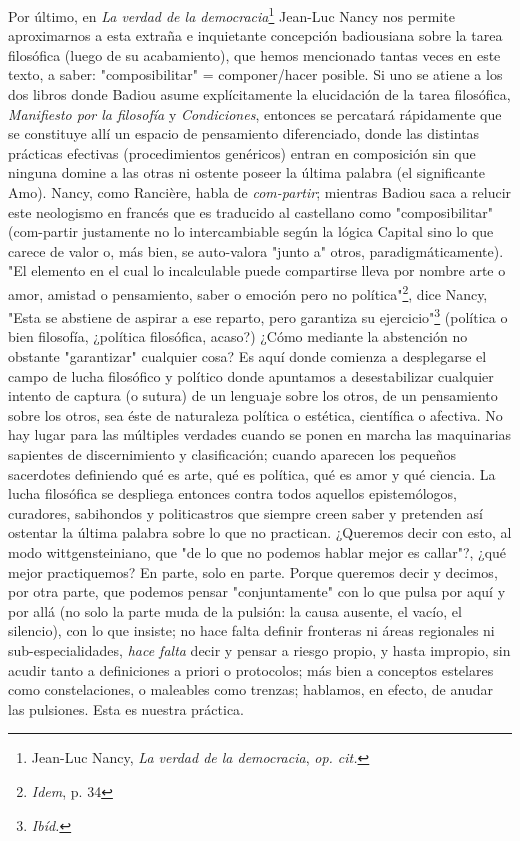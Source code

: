 \documentclass{book}
\begin{document}
Por último, en \emph{La verdad de la democracia}\footnote{Jean-Luc
  Nancy, \emph{La verdad de la democracia}, \emph{op. cit.}} Jean-Luc
Nancy nos permite aproximarnos a esta extraña e inquietante concepción
badiousiana sobre la tarea filosófica (luego de su acabamiento), que
hemos mencionado tantas veces en este texto, a saber: "composibilitar" =
componer/hacer posible. Si uno se atiene a los dos libros donde Badiou
asume explícitamente la elucidación de la tarea filosófica,
\emph{Manifiesto por la filosofía} y \emph{Condiciones}, entonces se
percatará rápidamente que se constituye allí un espacio de pensamiento
diferenciado, donde las distintas prácticas efectivas (procedimientos
genéricos) entran en composición sin que ninguna domine a las otras ni
ostente poseer la última palabra (el significante Amo). Nancy, como
Rancière, habla de \emph{com-partir}; mientras Badiou saca a relucir
este neologismo en francés que es traducido al castellano como
"composibilitar" (com-partir justamente no lo intercambiable según la
lógica Capital sino lo que carece de valor o, más bien, se auto-valora
"junto a" otros, paradigmáticamente). "El elemento en el cual lo
incalculable puede compartirse lleva por nombre arte o amor, amistad o
pensamiento, saber o emoción pero no política"\footnote{\emph{Idem}, p.
  34}, dice Nancy, "Esta se abstiene de aspirar a ese reparto, pero
garantiza su ejercicio"\footnote{\emph{Ibíd.}} (política o bien
filosofía, ¿política filosófica, acaso?) ¿Cómo mediante la abstención no
obstante "garantizar" cualquier cosa? Es aquí donde comienza a
desplegarse el campo de lucha filosófico y político donde apuntamos a
desestabilizar cualquier intento de captura (o sutura) de un lenguaje
sobre los otros, de un pensamiento sobre los otros, sea éste de
naturaleza política o estética, científica o afectiva. No hay lugar para
las múltiples verdades cuando se ponen en marcha las maquinarias
sapientes de discernimiento y clasificación; cuando aparecen los
pequeños sacerdotes definiendo qué es arte, qué es política, qué es amor
y qué ciencia. La lucha filosófica se despliega entonces contra todos
aquellos epistemólogos, curadores, sabihondos y politicastros que
siempre creen saber y pretenden así ostentar la última palabra sobre lo
que no practican. ¿Queremos decir con esto, al modo wittgensteiniano,
que "de lo que no podemos hablar mejor es callar"?, ¿qué mejor
practiquemos? En parte, solo en parte. Porque queremos decir y decimos,
por otra parte, que podemos pensar "conjuntamente" con lo que pulsa por
aquí y por allá (no solo la parte muda de la pulsión: la causa ausente,
el vacío, el silencio), con lo que insiste; no hace falta definir
fronteras ni áreas regionales ni sub-especialidades, \emph{hace falta}
decir y pensar a riesgo propio, y hasta impropio, sin acudir tanto a
definiciones a priori o protocolos; más bien a conceptos estelares como
constelaciones, o maleables como trenzas; hablamos, en efecto, de anudar
las pulsiones. Esta es nuestra práctica.
\end{document}
